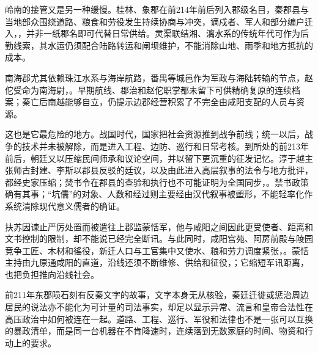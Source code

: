 岭南的接管又是另一种缓慢。桂林、象郡在前214年前后列入郡级名目，秦郡县与当地部众围绕道路、粮食和劳役发生持续协商与冲突，谪戍者、军人和部分编户迁入，，并非一纸郡名即可代替日常供给。灵渠联结湘、漓水系的传统年代可作为后勤线索，其水运仍须配合陆路转运和闸坝维护，不能消除山地、雨季和地方抵抗的成本。

南海郡尤其依赖珠江水系与海岸航路，番禺等城邑作为军政与海陆转输的节点，赵佗受命为南海尉，。早期航线、郡治和赵佗职掌都未留下可供精确复原的连续档案；秦亡后南越能够自立，仍提示边郡经营积累了不完全由咸阳支配的人员与资源。

这也是它最危险的地方。战国时代，国家把社会资源推到战争前线；统一以后，战争的技术并未被解除，而是进入工程、边防、巡行和日常考核。到所处的前213年前后，朝廷又以压缩民间师承和议论空间，并以留下更沉重的征发记忆。淳于越主张师古封建、李斯以郡县反驳的廷议，以及由此进入高层叙事的法令与地方批评，都经史家压缩；焚书令在郡县的查验和执行也不可能证明为全国同步，。禁书政策确有其事；“坑儒”的对象、人数和经过则主要经由汉代叙事被塑形，不能轻率化作系统清除现代意义儒者的确证。

扶苏因谏止严厉处置而被遣往上郡监蒙恬军，他与咸阳之间因此更受使者、距离和文书控制的限制，却不能说已经完全断讯。与此同时，咸阳宫苑、阿房前殿与陵园竞争工匠、木材和徭役，新迁人口与工官集中又使水、粮和劳力调度紧张，。蒙恬主持由九原通咸阳的直道，沿线还须不断维修、供给和征役，；它缩短军讯距离，也把负担推向沿线社会。

前211年东郡陨石刻有反秦文字的故事，文字本身无从核验，秦廷迁徙或惩治周边居民的说法亦不能化为可计量的司法事实，却足以显示异常、流言和皇帝合法性在高压政治中如何被连在一起。道路、工程、巡行、军役和法律也不是一张可以互换的暴政清单，而是同一台机器在不肯降速时，连续落到无数家庭的时间、物资和行动上的要求。

